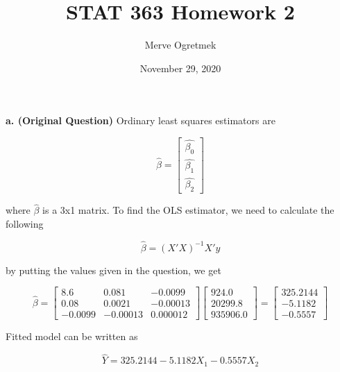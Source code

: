 \documentclass{article}
\title{STAT 363 Homework 2}
\author{Merve Ogretmek}
\date{November 29, 2020}
\begin{document}
\maketitle
\section{}

\textbf{a. (Original Question)} 
Ordinary least squares estimators are 


\begin{equation}
%
    \hat{\beta} = 
    \begin{bmatrix} 
    \hat{\beta_0} \\ 
    \hat{\beta_1} \\ \hat{\beta_2}
    \end{bmatrix}
%    
\end{equation}

where $\hat{\beta}$ is a 3x1 matrix. To find the OLS estimator, we need to calculate the following

\begin{equation}
    \hat{\beta} = (X'X)^{-1}X'y 
\end{equation}

by putting the values given in the question, we get

\begin{equation}
    \hat{\beta} = 
    \begin{bmatrix} 
    8.6 & 0.081 & -0.0099 \\
    0.08 & 0.0021 & -0.00013 \\
    -0.0099 & -0.00013 & 0.000012
    \end{bmatrix} 
    \begin{bmatrix} 
    924.0  \\
    20299.8  \\
    935906.0 
    \end{bmatrix} 
    = 
    \begin{bmatrix} 
    325.2144  \\
    -5.1182  \\
    -0.5557
    \end{bmatrix} 
\end{equation}
%

Fitted model can be written as

\begin{equation}
    \hat{Y} = 325.2144 - 5.1182X_1 - 0.5557X_2
\end{equation}
\\
\end{document}
